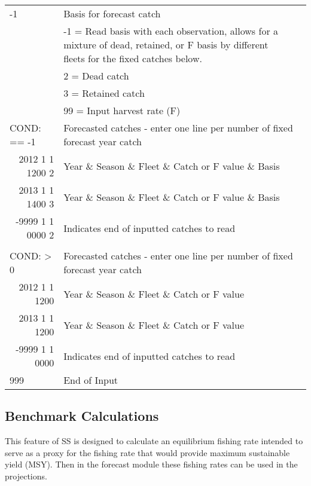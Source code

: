 \begin{landscape}
{\begin{longtable}{p{3.2cm} p{7cm} p{10.8cm}}
  \pagebreak
    -1 & Basis for forecast catch & \Tstrut\\
    & -1 = Read basis with each observation, allows for a mixture of dead, retained, or F basis by different fleets for the fixed catches below. & \\
    & 2 = Dead catch & \\
    & 3 = Retained catch & \\
    & 99 = Input harvest rate (F) & \Bstrut\\
    
  \hline
  \multicolumn{1}{l}{COND: == -1 }& \multicolumn{2}{l}{Forecasted catches - enter one line per number of fixed forecast year catch} \Tstrut\\
  \multicolumn{1}{r}{2012 1 1 1200 2}  & \multicolumn{2}{l}{Year \& Season \& Fleet \& Catch or F value \& Basis}  \\
  \multicolumn{1}{r}{2013 1 1 1400 3}  & \multicolumn{2}{l}{Year \& Season \& Fleet \& Catch or F value \& Basis}  \\
  \multicolumn{1}{r}{-9999 1 1 0000 2}  & \multicolumn{2}{l}{Indicates end of inputted catches to read}  \Bstrut\\
  \\
  \multicolumn{1}{l}{COND: > 0 }& \multicolumn{2}{l}{Forecasted catches - enter one line per number of fixed forecast year catch }\Tstrut\\
  \multicolumn{1}{r}{2012  1 1 1200}  & \multicolumn{2}{l}{Year \& Season \& Fleet \& Catch or F value}  \\
  \multicolumn{1}{r}{2013  1 1 1200}  & \multicolumn{2}{l}{Year \& Season \& Fleet \& Catch or F value}  \\
  \multicolumn{1}{r}{-9999 1 1 0000}  & \multicolumn{2}{l}{Indicates end of inputted catches to read}  \Bstrut\\
  
  \hline
  999 & End of Input & \Bstrut\\

  \end{longtable}}  
\end{landscape}

\hypertarget{Benchmark}{}
\subsection{Benchmark Calculations}
This feature of SS is designed to calculate an equilibrium fishing rate intended to serve as a proxy for the fishing rate that would provide maximum sustainable yield (MSY).  Then in the forecast module these fishing rates can be used in the projections.

